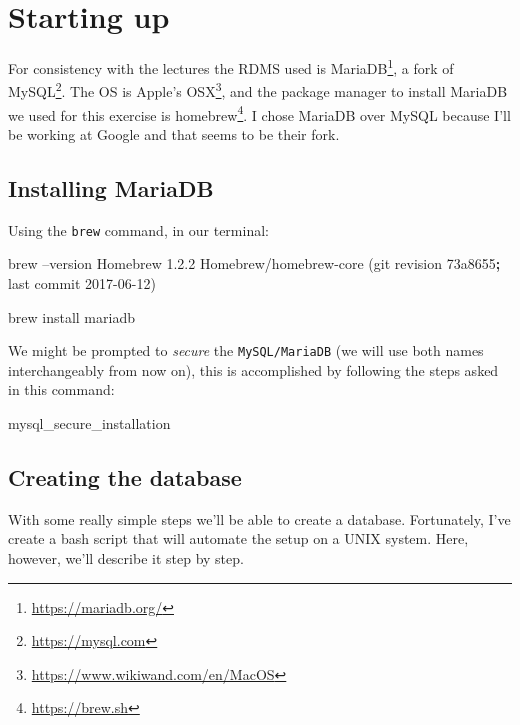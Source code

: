 \documentclass[english,a4paper,]{report}
\newenvironment{Shaded}{}{}
\newcommand{\KeywordTok}[1]{\textcolor[rgb]{0.00,0.44,0.13}{\textbf{#1}}}
\newcommand{\FunctionTok}[1]{\textcolor[rgb]{0.02,0.16,0.49}{#1}}
\newcommand{\ExtensionTok}[1]{#1}
\newcommand{\NormalTok}[1]{#1}
\renewcommand{\href}[2]{#2\footnote{\url{#1}}}
\begin{document}
\chapter{Starting up}\label{starting-up}

For consistency with the lectures the RDMS used is
\href{https://mariadb.org/}{MariaDB}, a fork of
\href{https://mysql.com}{MySQL}. The OS is Apple's
\href{https://www.wikiwand.com/en/MacOS}{OSX}, and the package manager
to install MariaDB we used for this exercise is
\href{https://brew.sh}{homebrew}. I chose MariaDB over MySQL because
I'll be working at Google and that seems to be their fork.

\section{Installing MariaDB}\label{installing-mariadb}

Using the \texttt{brew} command, in our terminal:

\begin{Shaded}
\begin{Highlighting}[]
\ExtensionTok{brew}\NormalTok{ --version}
\ExtensionTok{Homebrew}\NormalTok{ 1.2.2}
\ExtensionTok{Homebrew/homebrew-core}\NormalTok{ (git revision 73a8655}\KeywordTok{;} \FunctionTok{last}\NormalTok{ commit 2017-06-12)}

\ExtensionTok{brew}\NormalTok{ install mariadb}
\end{Highlighting}
\end{Shaded}

We might be prompted to \emph{secure} the \texttt{MySQL/MariaDB} (we
will use both names interchangeably from now on), this is accomplished
by following the steps asked in this command:

\begin{Shaded}
\begin{Highlighting}[]
\ExtensionTok{mysql_secure_installation}
\end{Highlighting}
\end{Shaded}

\section{Creating the database}\label{creating-the-database}

With some really simple steps we'll be able to create a database.
Fortunately, I've create a bash script that will automate the setup on a
UNIX system. Here, however, we'll describe it step by step.
\end{document}
